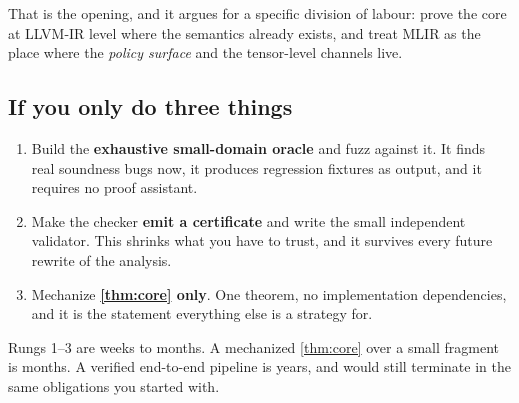 That is the opening, and it argues for a specific division of labour: prove the
core at LLVM-IR level where the semantics already exists, and treat MLIR as the
place where the \emph{policy surface} and the tensor-level channels live.

\subsection{If you only do three things}

\begin{enumerate}[leftmargin=1.8em]
\item Build the \textbf{exhaustive small-domain oracle} and fuzz against it. It
      finds real soundness bugs now, it produces regression fixtures as output,
      and it requires no proof assistant.
\item Make the checker \textbf{emit a certificate} and write the small
      independent validator. This shrinks what you have to trust, and it survives
      every future rewrite of the analysis.
\item Mechanize \textbf{\cref{thm:core} only}. One theorem, no implementation
      dependencies, and it is the statement everything else is a strategy for.
\end{enumerate}

Rungs 1--3 are weeks to months. A mechanized \cref{thm:core} over a small
fragment is months. A verified end-to-end pipeline is years, and would still
terminate in the same  obligations you started with.
